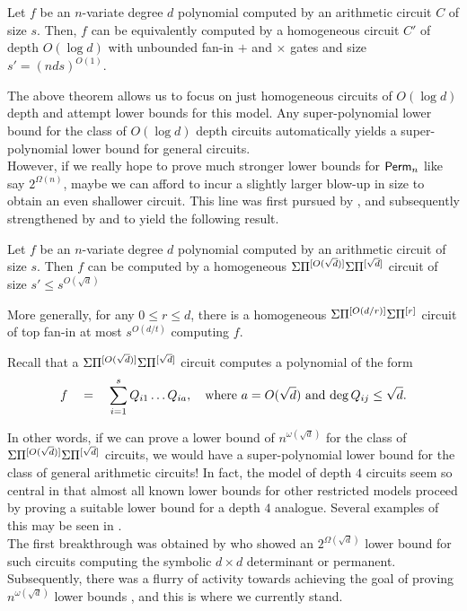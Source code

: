 \begin{theorem}
Let $f$ be an $n$-variate degree $d$ polynomial computed by an arithmetic circuit $C$ of size $s$. 
Then, $f$ can be equivalently computed by a homogeneous circuit $C'$ of depth $O(\log d)$ with unbounded fan-in $+$ and $\times$ gates and size $s' = (nds)^{O(1)}$. 
\end{theorem}


The above theorem allows us to focus on just homogeneous circuits of $O(\log d)$ depth and attempt lower bounds for this model. 
Any super-polynomial lower bound for the class of $O(\log d)$ depth circuits automatically yields a super-polynomial lower bound for general circuits. \\

However, if we really hope to prove much stronger lower bounds for $\operatorname{\mathsf{Perm}}_n$ like say $2^{\Omega(n)}$, maybe we can afford to incur a slightly larger blow-up in size to obtain an even shallower circuit. 
This line was first pursued by \cite{av08}, and subsequently strengthened by \cite{koiran} and \cite{Tav13} to yield the following result. 

\begin{theorem} 
  Let $f$ be an $n$-variate degree $d$ polynomial computed by an arithmetic circuit of size $s$. 
Then $f$ can be computed by a homogeneous $\Sigma\Pi^{[O(\sqrt{d})]}\Sigma\Pi^{[\sqrt{d}]}$ circuit of size $s' \leq s^{O(\sqrt{d})}$

More generally, for any $0\leq r\leq d$, there is a homogeneous $\Sigma\Pi^{[O(d/r)]}\Sigma\Pi^{[r]}$ circuit of top fan-in at most $s^{O(d/t)}$ computing $f$. 
\end{theorem}

Recall that a $\Sigma\Pi^{[O(\sqrt{d})]}\Sigma\Pi^{[\sqrt{d}]}$ circuit computes a polynomial of the form
\[
f\quad = \quad \sum_{i=1}^s Q_{i1}\dots Q_{ia},\quad \text{where $a = O(\sqrt{d})$ and $\deg Q_{ij} \leq \sqrt{d}$}.
\]

In other words, if we can prove a lower bound of $n^{\omega(\sqrt{d})}$ for the class of $\Sigma\Pi^{[O(\sqrt{d})]}\Sigma\Pi^{[\sqrt{d}]}$ circuits, we would have a super-polynomial lower bound for the class of general arithmetic circuits! 
In fact, the model of depth $4$ circuits seem so central in that almost all known lower bounds for other restricted models proceed by proving a suitable lower bound for a depth $4$ analogue. 
Several examples of this may be seen in \cite{KayalRP}. \\

The first breakthrough was obtained by \cite{gkks13} who showed an $2^{\Omega(\sqrt{d})}$ lower bound for such circuits computing the symbolic $d\times d$ determinant or permanent. 
Subsequently, there was a flurry of activity towards achieving the goal of proving $n^{\omega(\sqrt{d})}$ lower bounds \cite{KSS13,FLMS13,KS14a}, and this is where we currently stand. 

